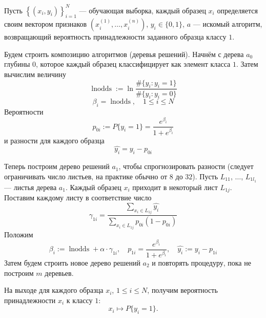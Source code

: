 \documentclass[12pt]{article}
\begin{document}
	
	Пусть $\left\{(x_i,y_i)\right\}_{i=1}^{N}$ --- обучающая выборка, каждый образец $x_i$ определяется своим вектором признаков $(x_i^{(1)},\dots, x_i^{(n)})$, $y_i\in\{0,1\}$, $a$ --- искомый алгоритм, возвращающий вероятность принадлежности заданного образца классу $1$.

Будем строить композицию алгоритмов (деревья решений). Начнём с дерева $a_0$ глубины $0$, которое каждый образец классифицирует как элемент класса $1$. Затем вычислим величину
	\begin{equation*}
		\operatorname{lnodds}:=\ln\frac{\#\{y_i:y_i=1\}}{\#\{y_i:y_i=0\}}
	\end{equation*}
\begin{equation*}
	\beta_i=\operatorname{lnodds}, \quad 1\leqslant i\leqslant N
\end{equation*}
Вероятности
\begin{equation*}
	p_{0i}:=P\{y_i=1\}=\frac{e^{\beta_i}}{1+e^{\beta_i}}
\end{equation*}
и разности для каждого образца
\begin{equation*}
	\widehat{y_i}=y_i-p_{0i}
\end{equation*}

Теперь построим дерево решений $a_1$, чтобы спрогнозировать разности (следует ограничивать число листьев, на практике обычно от $8$ до $32$). Пусть $L_{11}$, $\dots$, $L_{1l_1}$ --- листья дерева $a_1$. Каждый образец $x_i$ приходит в некоторый лист $L_{1j}$. Поставим каждому листу в соответствие число
\begin{equation*}
	\gamma_{1i}=\frac{\sum\limits_{x_i\in L_{1j}}\widehat{y_i}}{\sum\limits_{x_i\in L_{1j}}p_{0i}(1-p_{0i})}
\end{equation*}
Положим
\begin{equation*}
	\beta_i:=\operatorname{lnodds}+\alpha\cdot\gamma_{1i}, \quad p_{1i}=\frac{e^{\beta_i}}{1+e^{\beta_i}}, \quad \widehat{y_i}:=y_i-p_{1i}
\end{equation*}
Затем будем строить новое дерево решений $a_2$ и повторять процедуру, пока не построим $m$ деревьев.

На выходе для каждого образца $x_i$, $1\leqslant i\leqslant N$, получим вероятность принадлежности $x_i$ к классу $1$:
\begin{equation*}
	x_i\mapsto P\{y_i=1\}.
\end{equation*}
\end{document}

